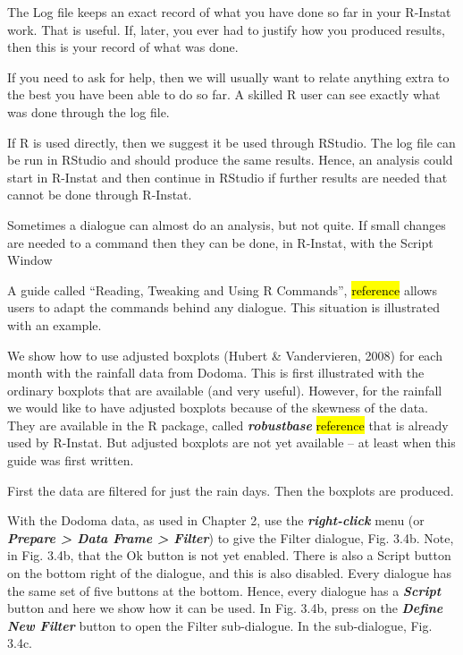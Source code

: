 \documentclass[
  letterpaper,
  DIV=11,
  numbers=noendperiod]{scrreprt}
\begin{document}
The Log file keeps an exact record of what you have done so far in your
R-Instat work. That is useful. If, later, you ever had to justify how
you produced results, then this is your record of what was done.

If you need to ask for help, then we will usually want to relate
anything extra to the best you have been able to do so far. A skilled R
user can see exactly what was done through the log file.

If R is used directly, then we suggest it be used through RStudio. The
log file can be run in RStudio and should produce the same results.
Hence, an analysis could start in R-Instat and then continue in RStudio
if further results are needed that cannot be done through R-Instat.

Sometimes a dialogue can almost do an analysis, but not quite. If small
changes are needed to a command then they can be done, in R-Instat, with
the Script Window

A guide called ``Reading, Tweaking and Using R Commands'',
\hl{reference} allows users to adapt the commands behind any dialogue.
This situation is illustrated with an example.

We show how to use adjusted boxplots (Hubert \& Vandervieren, 2008) for
each month with the rainfall data from Dodoma. This is first illustrated
with the ordinary boxplots that are available (and very useful).
However, for the rainfall we would like to have adjusted boxplots
because of the skewness of the data. They are available in the R
package, called \textbf{\emph{robustbase}} \hl{reference} that is
already used by R-Instat. But adjusted boxplots are not yet available --
at least when this guide was first written.

First the data are filtered for just the rain days. Then the boxplots
are produced.

With the Dodoma data, as used in Chapter 2, use the
\textbf{\emph{right-click}} menu (or \textbf{\emph{Prepare
\textgreater{} Data Frame \textgreater{} Filter}}) to give the Filter
dialogue, Fig. 3.4b. Note, in Fig. 3.4b, that the Ok button is not yet
enabled. There is also a Script button on the bottom right of the
dialogue, and this is also disabled. Every dialogue has the same set of
five buttons at the bottom. Hence, every dialogue has a
\textbf{\emph{Script}} button and here we show how it can be used. In
Fig. 3.4b, press on the \textbf{\emph{Define New Filter}} button to open
the Filter sub-dialogue. In the sub-dialogue, Fig. 3.4c.
\end{document}
